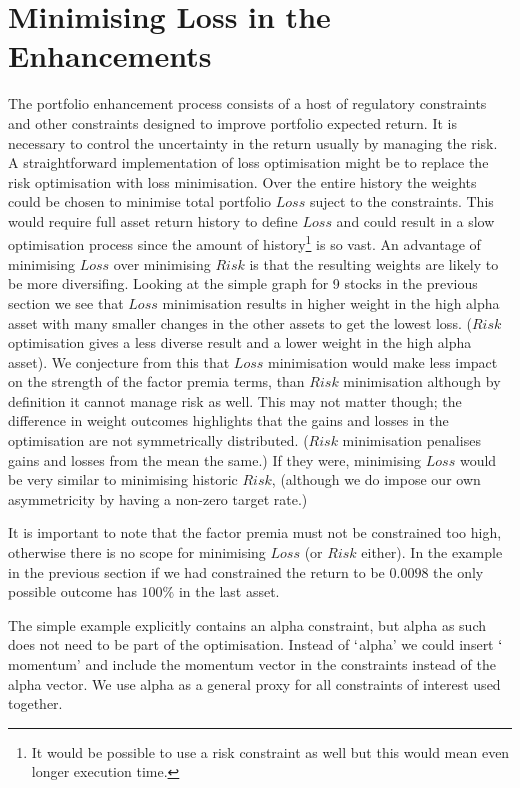 \documentclass[12pt]{article}
\begin{document}
\section{Minimising Loss in the Enhancements}
The portfolio enhancement process consists of a host of regulatory constraints and other constraints 
designed to improve portfolio expected return. It is necessary to control the uncertainty in the return usually 
by managing the risk.
A straightforward implementation of loss optimisation might be to replace the risk optimisation with loss minimisation.
Over the entire history the weights could be chosen to minimise total portfolio $Loss$ suject to the constraints.
This would require full asset return history to define $Loss$ and could 
result in a slow optimisation process since the amount of history\footnote{It would be possible 
to use a risk constraint as well but this would mean even longer execution time.} is so vast.  An advantage of
minimising $Loss$ over minimising $Risk$ is that the resulting weights are likely
to be more diversifing. Looking at the simple graph for 9 stocks in the previous section we see that
$Loss$ minimisation results in higher weight in the high alpha asset with many 
smaller changes in the other assets to get the lowest loss. ($Risk$ optimisation gives a less diverse
result and a lower weight in the high alpha asset). We conjecture from this that $Loss$ minimisation 
would make less impact on the strength of the factor premia terms, than $Risk$ minimisation although by definition it cannot
manage risk as well. This may not matter though; the difference in weight outcomes
highlights that the gains and losses in the optimisation are not symmetrically
distributed. ($Risk$ minimisation penalises gains and losses from the mean the same.) If they were, minimising $Loss$ would be very similar to minimising historic $Risk$, (although
we do impose our own asymmetricity by having a non-zero target rate.) 

It is important
to note that the factor premia must not be constrained too high, otherwise there is no scope 
for minimising $Loss$ (or $Risk$ either). In the example in the previous section 
if we had constrained the return to be $0.0098$ the only possible outcome has $100\%$ in 
the last asset.

The simple example explicitly contains an alpha constraint, but alpha as such does not need to 
be part of the optimisation. Instead of $`$alpha' we could insert $`$momentum' and include the momentum 
vector in the constraints instead of the alpha vector. We use alpha as a general proxy for all 
constraints of interest used together.
\end{document}
